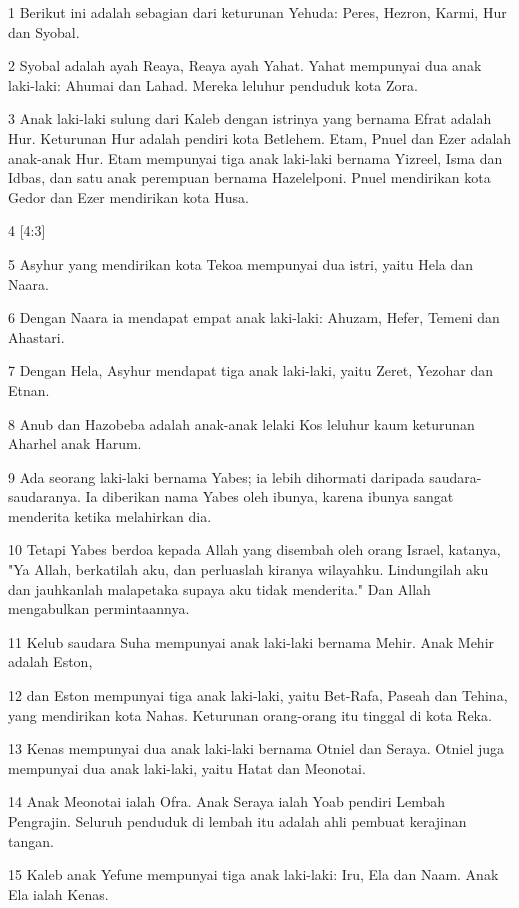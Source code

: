 \par 1 Berikut ini adalah sebagian dari keturunan Yehuda: Peres, Hezron, Karmi, Hur dan Syobal.
\par 2 Syobal adalah ayah Reaya, Reaya ayah Yahat. Yahat mempunyai dua anak laki-laki: Ahumai dan Lahad. Mereka leluhur penduduk kota Zora.
\par 3 Anak laki-laki sulung dari Kaleb dengan istrinya yang bernama Efrat adalah Hur. Keturunan Hur adalah pendiri kota Betlehem. Etam, Pnuel dan Ezer adalah anak-anak Hur. Etam mempunyai tiga anak laki-laki bernama Yizreel, Isma dan Idbas, dan satu anak perempuan bernama Hazelelponi. Pnuel mendirikan kota Gedor dan Ezer mendirikan kota Husa.
\par 4 [4:3]
\par 5 Asyhur yang mendirikan kota Tekoa mempunyai dua istri, yaitu Hela dan Naara.
\par 6 Dengan Naara ia mendapat empat anak laki-laki: Ahuzam, Hefer, Temeni dan Ahastari.
\par 7 Dengan Hela, Asyhur mendapat tiga anak laki-laki, yaitu Zeret, Yezohar dan Etnan.
\par 8 Anub dan Hazobeba adalah anak-anak lelaki Kos leluhur kaum keturunan Aharhel anak Harum.
\par 9 Ada seorang laki-laki bernama Yabes; ia lebih dihormati daripada saudara-saudaranya. Ia diberikan nama Yabes oleh ibunya, karena ibunya sangat menderita ketika melahirkan dia.
\par 10 Tetapi Yabes berdoa kepada Allah yang disembah oleh orang Israel, katanya, "Ya Allah, berkatilah aku, dan perluaslah kiranya wilayahku. Lindungilah aku dan jauhkanlah malapetaka supaya aku tidak menderita." Dan Allah mengabulkan permintaannya.
\par 11 Kelub saudara Suha mempunyai anak laki-laki bernama Mehir. Anak Mehir adalah Eston,
\par 12 dan Eston mempunyai tiga anak laki-laki, yaitu Bet-Rafa, Paseah dan Tehina, yang mendirikan kota Nahas. Keturunan orang-orang itu tinggal di kota Reka.
\par 13 Kenas mempunyai dua anak laki-laki bernama Otniel dan Seraya. Otniel juga mempunyai dua anak laki-laki, yaitu Hatat dan Meonotai.
\par 14 Anak Meonotai ialah Ofra. Anak Seraya ialah Yoab pendiri Lembah Pengrajin. Seluruh penduduk di lembah itu adalah ahli pembuat kerajinan tangan.
\par 15 Kaleb anak Yefune mempunyai tiga anak laki-laki: Iru, Ela dan Naam. Anak Ela ialah Kenas.
